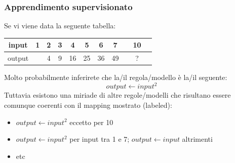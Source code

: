 \begin{frame}

	\frametitle{Apprendimento supervisionato}


		Se vi viene data la seguente tabella:
		\begin{table}[]
			\begin{tabular}{ccccccccccc}
				\multicolumn{1}{c|}{input} 		& 1 & 2 & 3 & 4 & 5 & 6 & 7 & & 10 &  \\ \hline
				\multicolumn{1}{l|}{output}     & \undermat{labeled}{1 & 4 & 9 & 16 & 25 & 36 & 49 &} \undermat{unlabeled}{& ? &}  \\
			\end{tabular}
		\end{table}
		\vspace{5mm}

		\pause
		Molto probabilmente inferirete che la/il regola/modello è la/il seguente:
		$$output \leftarrow input^2 $$
		\pause
		Tuttavia esistono una miriade di altre regole/modelli che risultano essere comunque coerenti con il mapping mostrato (labeled):
		\begin{itemize}
			\item $output \leftarrow input^2$ eccetto per 10
			\item $output \leftarrow input^2$ per input tra 1 e 7; $output \leftarrow input$ altrimenti
			\item etc
		\end{itemize}





\end{frame}

